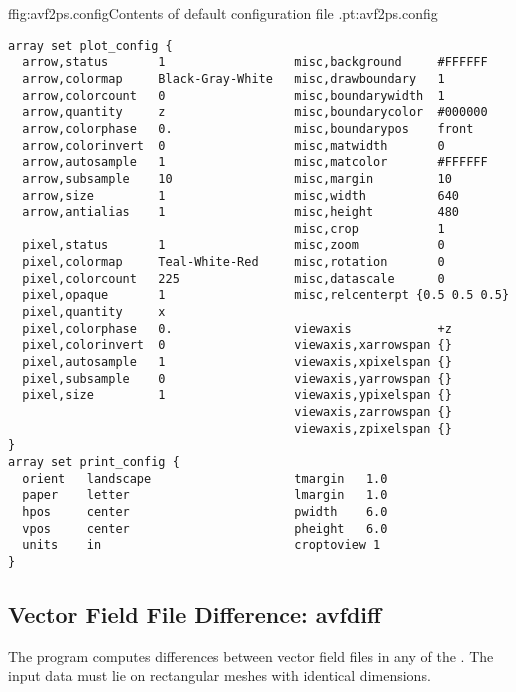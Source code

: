 \begin{codelisting}{f}{fig:avf2ps.config}{Contents of default configuration
file .}{pt:avf2ps.config}
\begin{verbatim}
array set plot_config {
  arrow,status       1                  misc,background     #FFFFFF
  arrow,colormap     Black-Gray-White   misc,drawboundary   1
  arrow,colorcount   0                  misc,boundarywidth  1
  arrow,quantity     z                  misc,boundarycolor  #000000
  arrow,colorphase   0.                 misc,boundarypos    front
  arrow,colorinvert  0                  misc,matwidth       0
  arrow,autosample   1                  misc,matcolor       #FFFFFF
  arrow,subsample    10                 misc,margin         10
  arrow,size         1                  misc,width          640
  arrow,antialias    1                  misc,height         480
                                        misc,crop           1
  pixel,status       1                  misc,zoom           0
  pixel,colormap     Teal-White-Red     misc,rotation       0
  pixel,colorcount   225                misc,datascale      0
  pixel,opaque       1                  misc,relcenterpt {0.5 0.5 0.5}
  pixel,quantity     x
  pixel,colorphase   0.                 viewaxis            +z
  pixel,colorinvert  0                  viewaxis,xarrowspan {}
  pixel,autosample   1                  viewaxis,xpixelspan {}
  pixel,subsample    0                  viewaxis,yarrowspan {}
  pixel,size         1                  viewaxis,ypixelspan {}
                                        viewaxis,zarrowspan {}
                                        viewaxis,zpixelspan {}
}
array set print_config {
  orient   landscape                    tmargin   1.0
  paper    letter                       lmargin   1.0
  hpos     center                       pwidth    6.0
  vpos     center                       pheight   6.0
  units    in                           croptoview 1
}
\end{verbatim}
\end{codelisting}


\subsection{Vector Field File Difference:
          avfdiff}\label{sec:avfdiff}%
%
The  program computes differences between vector field files
in any of the .  The input data must lie on rectangular meshes with
identical dimensions.

